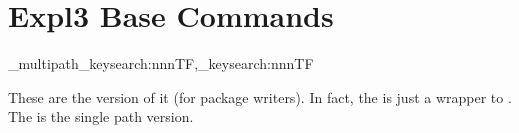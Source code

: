 \documentclass[10pt]{article}
\begin{document}

\section{Expl3 Base Commands}
\begin{codedescribe}{\pgfkeysearch_multipath_keysearch:nnnTF,\pgfkeysearch_keysearch:nnnTF}
\begin{codesyntax}%
\end{codesyntax}
These are the  version of it (for package writers). In fact, the \tsobj{\pgfkeysearchvalueof} is just a wrapper to . The  is the single path version.
\end{codedescribe}
\end{document}

